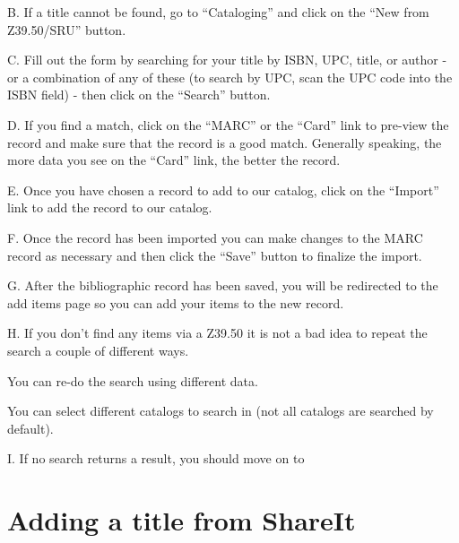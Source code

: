 \documentclass[letterpaper,10pt,english]{sphinxmanual}
\begin{document}

B. If a title cannot be found, go to “Cataloging” and click on the “New
from Z39.50/SRU” button.

C. Fill out the form by searching for your title by ISBN, UPC, title, or
author - or a combination of any of these (to search by UPC, scan the
UPC code into the ISBN field) - then click on the “Search” button.

D. If you find a match, click on the “MARC” or the “Card” link to
pre-view the record and make sure that the record is a good match.
Generally speaking, the more data you see on the “Card” link, the better
the record.

E. Once you have chosen a record to add to our catalog, click on the
“Import” link to add the record to our catalog.

F. Once the record has been imported you can make changes to the MARC
record as necessary and then click the “Save” button to finalize the
import.

G. After the bibliographic record has been saved, you will be redirected
to the add items page so you can add your items to the new record.


H. If you don’t find any items via a Z39.50 it is not a bad idea to
repeat the search a couple of different ways.

You can re-do the search using different data.

You can select different catalogs to search in (not all catalogs are
searched by default).

I. If no search returns a result, you should move on to 



\chapter{Adding a title from ShareIt}
\label{\detokenize{copy-cataloging/adding-a-title-from-shareit:adding-a-title-from-shareit}}\label{\detokenize{copy-cataloging/adding-a-title-from-shareit::doc}}
\end{document}
